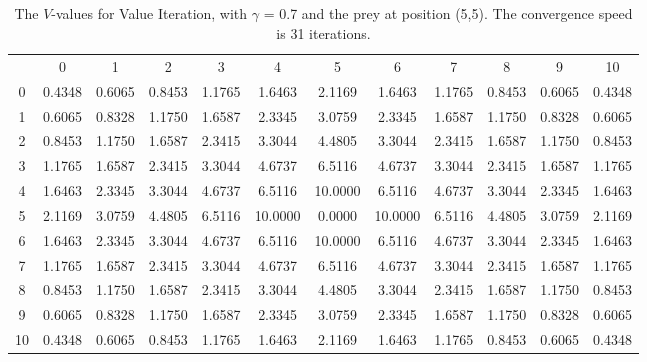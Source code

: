 \documentclass{article}
\begin{document}
\subsection*{}
\begin{table}[htb]
\centering
\begin{footnotesize}
\begin{tabular} {c c c c c c c c c c c c}
 & 0 & 1 & 2 & 3 & 4 & 5 & 6 & 7 & 8 & 9 & 10 \\
0 &  0.4348 &  0.6065 &  0.8453 &  1.1765 &  1.6463 &  2.1169 &  1.6463 &  1.1765 &  0.8453 &  0.6065 &  0.4348\\
1 &  0.6065 &  0.8328 &  1.1750 &  1.6587 &  2.3345 &  3.0759 &  2.3345 &  1.6587 &  1.1750 &  0.8328 &  0.6065\\
2 &  0.8453 &  1.1750 &  1.6587 &  2.3415 &  3.3044 &  4.4805 &  3.3044 &  2.3415 &  1.6587 &  1.1750 &  0.8453\\
3 &  1.1765 &  1.6587 &  2.3415 &  3.3044 &  4.6737 &  6.5116 &  4.6737 &  3.3044 &  2.3415 &  1.6587 &  1.1765\\
4 &  1.6463 &  2.3345 &  3.3044 &  4.6737 &  6.5116 & 10.0000 &  6.5116 &  4.6737 &  3.3044 &  2.3345 &  1.6463\\
5 &  2.1169 &  3.0759 &  4.4805 &  6.5116 & 10.0000 &  0.0000 & 10.0000 &  6.5116 &  4.4805 &  3.0759 &  2.1169\\
6 &  1.6463 &  2.3345 &  3.3044 &  4.6737 &  6.5116 & 10.0000 &  6.5116 &  4.6737 &  3.3044 &  2.3345 &  1.6463\\
7 &  1.1765 &  1.6587 &  2.3415 &  3.3044 &  4.6737 &  6.5116 &  4.6737 &  3.3044 &  2.3415 &  1.6587 &  1.1765\\
8 &  0.8453 &  1.1750 &  1.6587 &  2.3415 &  3.3044 &  4.4805 &  3.3044 &  2.3415 &  1.6587 &  1.1750 &  0.8453\\
9 &  0.6065 &  0.8328 &  1.1750 &  1.6587 &  2.3345 &  3.0759 &  2.3345 &  1.6587 &  1.1750 &  0.8328 &  0.6065\\
10 &  0.4348 &  0.6065 &  0.8453 &  1.1765 &  1.6463 &  2.1169 &  1.6463 &  1.1765 &  0.8453 &  0.6065 &  0.4348\\
\end{tabular}\\
\end{footnotesize}
\caption{The $V$-values for Value Iteration, with $\gamma$ = 0.7 and the prey at position (5,5). The convergence speed is 31 iterations.}
\label{valueiteration3}
\end{table}
\end{document}
